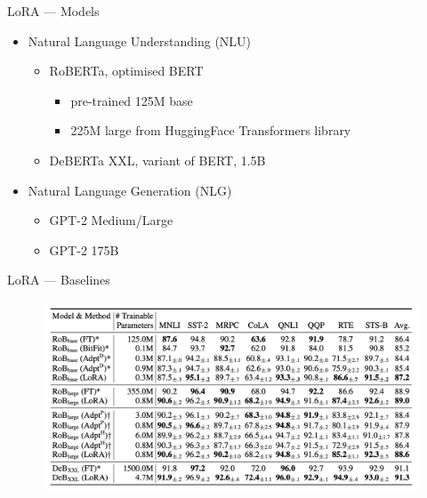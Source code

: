 \documentclass[aspectratio=169,xcolor=dvipsnames]{beamer}
\begin{document}
\begin{frame}{LoRA --- Models}
    \begin{itemize}
        \item Natural Language Understanding (NLU)
        \begin{itemize}
            \item RoBERTa, optimised BERT
            \begin{itemize}
                \item pre-trained 125M base
                \item 225M large from HuggingFace Transformers library
            \end{itemize} 
            \item DeBERTa XXL, variant of BERT, 1.5B
        \end{itemize}
        \bigskip
        \item Natural Language Generation (NLG)
        \begin{itemize}
            \item GPT-2 Medium/Large 
            \item GPT-2 175B
        \end{itemize}
    \end{itemize}

\end{frame}


\begin{frame}{LoRA --- Baselines}
    \begin{figure}
        \centering
        \label{LoRA_baselines}
        \includegraphics[width=0.8 \linewidth]{figures/baselines.png}
    \end{figure}  
\end{frame}

\end{document}
